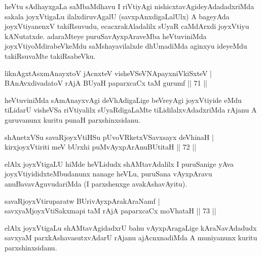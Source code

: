 \begin{artha}
heVtu sAdhayxgaLa saMbaMdhavu I riVtiyAgi nishicxtavAgideyAdadadxriMda sakala joyxVtigaLu ilalxdiruvAgalU (savxpAnxdigaLalUlx) A bageyAda joyxVtiyanenxV takiRsuvudu, ecacxrakAladalilx sUyaR caMdArxdi joyxVtiyu kANutatxde. adaraMteye puruSavAyxpAraveMba heVtuviniMda joyxVtiyoMdirabeVkeMdu saMshayavilalxde dhUmadiMda aginxyu ideyeMdu takiRsuvaMte takiRsabeVku.
\end{artha}


\begin{shl}
liknAgxtAsxmAnayxtoV jAcnxteV visheVSeVNApayxniVkiSxteV | \\
BAnAvxdivadatoV rAjA BUyaH paparxcaCx taM gurumf \hfill||  71 ||  
\end{shl}

\begin{artha}
heVtuviniMda sAmAnayxvAgi deVhAdigaLige beVreyAgi joyxVtiyide eMdu tiLidarU visheVSa riVtiyalilx sUyaRdigaLaMte tiLidilalxvAdadxriMda rAjanu A guruvanunx kuritu punaH parxshinxsidanu.
\end{artha}

\begin{shl}
shAnetxVSu savaRjoyxVtiHSu pUvoVRketxVSavxsayx deVhinaH | \\
kirxjoyxVtiriti meV bUrxhi puMvAyxpArAnuBUtitaH \hfill||  72 ||  
\end{shl}

\begin{artha}
elAlx joyxVtigaLU hiMde heVLidudx shAMtavAdalilx I puruSanige yAva joyxVtiyididxteMbudanunx nanage heVLu, puruSana vAyxpAravu anuBavavAguvudariMda (I parxshenxge avakAshavAyitu).
\end{artha}


\begin{shl}
savaRjoyxVtiruparatw BUrivAyxpArakAraNamf | \\
savxyaMjoyxVtiSakxmapi taM rAjA paparxcaCx moVhataH \hfill||  73 ||  
\end{shl}

\begin{artha}
elAlx joyxVtigaLu shAMtavAgidadxrU bahu vAyxpAragaLige kAraNavAdadudx savxyaM parxkAshavasutxvAdarU rAjanu ajAcnxnadiMda A muniyanunx kuritu parxshinxsidanu.
\end{artha}

